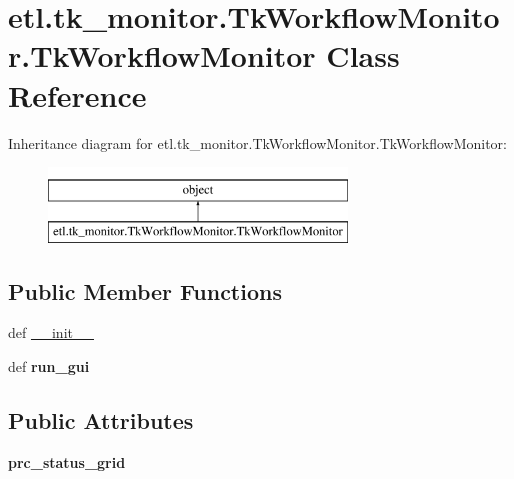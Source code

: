 \hypertarget{classetl_1_1tk__monitor_1_1TkWorkflowMonitor_1_1TkWorkflowMonitor}{\section{etl.\-tk\-\_\-monitor.\-Tk\-Workflow\-Monitor.\-Tk\-Workflow\-Monitor Class Reference}
\label{classetl_1_1tk__monitor_1_1TkWorkflowMonitor_1_1TkWorkflowMonitor}
}
Inheritance diagram for etl.\-tk\-\_\-monitor.\-Tk\-Workflow\-Monitor.\-Tk\-Workflow\-Monitor\-:\begin{figure}[H]
\begin{center}
\leavevmode
\includegraphics[height=2.000000cm]{classetl_1_1tk__monitor_1_1TkWorkflowMonitor_1_1TkWorkflowMonitor}
\end{center}
\end{figure}
\subsection*{Public Member Functions}
\begin{DoxyCompactItemize}
\item 
def \hyperlink{classetl_1_1tk__monitor_1_1TkWorkflowMonitor_1_1TkWorkflowMonitor_ae3eb503742314535f9f95f6f12f4bce9}{\-\_\-\-\_\-init\-\_\-\-\_\-}
\item 
\hypertarget{classetl_1_1tk__monitor_1_1TkWorkflowMonitor_1_1TkWorkflowMonitor_a6791de02595e3a35f1aa08f9d67dcdbb}{def {\bfseries run\-\_\-gui}}\label{classetl_1_1tk__monitor_1_1TkWorkflowMonitor_1_1TkWorkflowMonitor_a6791de02595e3a35f1aa08f9d67dcdbb}

\end{DoxyCompactItemize}
\subsection*{Public Attributes}
\begin{DoxyCompactItemize}
\item 
\hypertarget{classetl_1_1tk__monitor_1_1TkWorkflowMonitor_1_1TkWorkflowMonitor_a213c1624b03d062e111a639a421e1594}{{\bfseries prc\-\_\-status\-\_\-grid}}\label{classetl_1_1tk__monitor_1_1TkWorkflowMonitor_1_1TkWorkflowMonitor_a213c1624b03d062e111a639a421e1594}

\end{DoxyCompactItemize}


